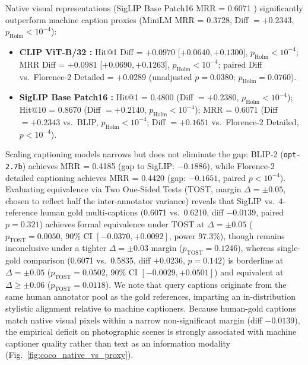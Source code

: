 Native visual representations (SigLIP Base Patch16 MRR = 0.6071 \cite{zhai2023siglip}) significantly outperform machine caption proxies (MiniLM MRR = 0.3728, Diff $= +0.2343$, $p_{\text{Holm}} < 10^{-4}$):
\begin{itemize}
    \setlength{\itemsep}{0.2pt plus 0.1pt}
    \setlength{\parskip}{0pt}
    \item \textbf{CLIP ViT-B/32 \cite{radford2021clip}:} Hit@1 Diff = $+0.0970$ [$+0.0640, +0.1300$], $p_{\text{Holm}} < 10^{-4}$; MRR Diff = $+0.0981$ [$+0.0690, +0.1263$], $p_{\text{Holm}} < 10^{-4}$; paired Diff vs.\ Florence-2 Detailed = $+0.0289$ (unadjusted $p=0.0380$; $p_{\text{Holm}} = 0.0760$).
    \item \textbf{SigLIP Base Patch16 \cite{zhai2023siglip}:} Hit@1 = $0.4800$ (Diff $= +0.2380$, $p_{\text{Holm}} < 10^{-4}$); Hit@10 = $0.8670$ (Diff $= +0.2140$, $p_{\text{Holm}} < 10^{-4}$); MRR = $0.6071$ (Diff $= +0.2343$ vs.\ BLIP, $p_{\text{Holm}} < 10^{-4}$; Diff $= +0.1651$ vs.\ Florence-2 Detailed, $p < 10^{-4}$).
\end{itemize}
Scaling captioning models narrows but does not eliminate the gap: BLIP-2 (\texttt{opt-2.7b}) \cite{li2023blip2} achieves MRR = 0.4185 (gap to SigLIP: $-0.1886$), while Florence-2 detailed captioning \cite{xiao2024florence2} achieves MRR = 0.4420 (gap: $-0.1651$, paired $p < 10^{-4}$). Evaluating equivalence via Two One-Sided Tests (TOST, margin $\Delta = \pm 0.05$, chosen to reflect half the inter-annotator variance) reveals that SigLIP vs.\ 4-reference human gold multi-captions (0.6071 vs.\ 0.6210, diff $-0.0139$, paired $p=0.321$) achieves formal equivalence under TOST at $\Delta = \pm 0.05$ ($p_{\text{TOST}} = 0.0050$, 90\% CI $[-0.0370, +0.0092]$, power 97.3\%), though remains inconclusive under a tighter $\Delta = \pm 0.03$ margin ($p_{\text{TOST}} = 0.1246$), whereas single-gold comparison (0.6071 vs.\ 0.5835, diff $+0.0236$, $p=0.142$) is borderline at $\Delta = \pm 0.05$ ($p_{\text{TOST}} = 0.0502$, 90\% CI $[-0.0029, +0.0501]$) and equivalent at $\Delta \ge \pm 0.06$ ($p_{\text{TOST}} = 0.0118$). We note that query captions originate from the same human annotator pool as the gold references, imparting an in-distribution stylistic alignment relative to machine captioners. Because human-gold captions match native visual pixels within a narrow non-significant margin (diff $-0.0139$), the empirical deficit on photographic scenes is strongly associated with machine captioner quality rather than text as an information modality (Fig.~\ref{fig:coco_native_vs_proxy}).

